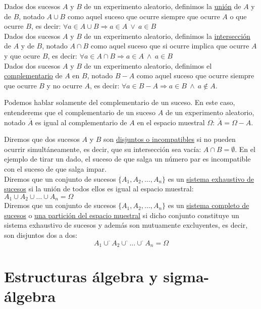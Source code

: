 Dados dos sucesos $A$ y $B$ de un experimento aleatorio, definimos la \underline{unión} de $A$ y de $B$,
notado $A \cup B$ como aquel suceso que ocurre siempre que ocurre $A$ o que ocurre $B$, es decir:
$\forall a \in A \cup B \Rightarrow a \in A \ \lor \ a \in B $\\


Dados dos sucesos $A$ y $B$ de un experimento aleatorio, definimos la \underline{intersección} de $A$ y
de $B$, notado $A \cap B$ como aquel suceso que si ocurre implica que ocurre $A$ y que ocure $B$, es decir:
$\forall a \in A \cap B \Rightarrow a \in A \ \land \ a \in B $\\


Dados dos sucesos $A$ y $B$ de un experimento aleatorio, definimos el \underline{complementario} de $A$
en $B$, notado $B-A$ como aquel suceso que ocurre siempre que ocurre $B$ y no ocurre $A$, es decir:
$\forall a \in B - A \Rightarrow a \in B \ \land \ a \notin A$.


Podemos hablar solamente del complementario de un suceso. En este caso, entenderems que el complementario
de un suceso $A$ de un experimento aleatorio, notado $\overline{A}$ es igual al complementario de $A$
en el espacio muestral $\Omega$: $\overline{A} = \Omega - A$.\\

\bigskip


Diremos que dos sucesos $A$ y $B$ son \underline{disjuntos o incompatibles} si no pueden ocurrir
simultáneamente, es decir, que su intersección sea vacía: $A \cap B = \emptyset$. En el ejemplo de
tirar un dado, el suceso de que salga un número par es incompatible con el suceso de que salga impar.\\


Diremos que un conjunto de sucesos $\{A_1, A_2, \ldots, A_n\}$ es un \newline \underline{sistema exhaustivo
  de sucesos} si la unión de todos ellos es igual al espacio muestral:
$A_1 \cup A_2 \cup \ldots \cup A_n = \Omega$ \\


Diremos que un conjunto de sucesos $\{A_1, A_2, \ldots, A_n\}$ es un \underline{sistema completo de sucesos} o \underline{una partición del espacio muestral} si dicho conjunto constituye un sistema exhaustivo
de sucesos y además son mutuamente excluyentes, es decir, son disjuntos dos a dos:
$$A_1 \mathop{\cup}^{\cdot} A_2 \mathop{\cup}^{\cdot} \ldots \mathop{\cup}^{\cdot} A_n = \Omega$$

\section{Estructuras álgebra y sigma-álgebra}

